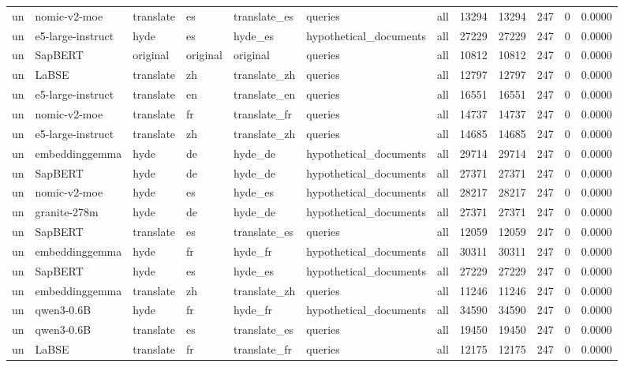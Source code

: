 \begin{tabular}{lllllllrrrrr}
un & nomic-v2-moe & translate & es & translate\_es & queries & all & 13294 & 13294 & 247 & 0 & 0.0000 \\
un & e5-large-instruct & hyde & es & hyde\_es & hypothetical\_documents & all & 27229 & 27229 & 247 & 0 & 0.0000 \\
un & SapBERT & original & original & original & queries & all & 10812 & 10812 & 247 & 0 & 0.0000 \\
un & LaBSE & translate & zh & translate\_zh & queries & all & 12797 & 12797 & 247 & 0 & 0.0000 \\
un & e5-large-instruct & translate & en & translate\_en & queries & all & 16551 & 16551 & 247 & 0 & 0.0000 \\
un & nomic-v2-moe & translate & fr & translate\_fr & queries & all & 14737 & 14737 & 247 & 0 & 0.0000 \\
un & e5-large-instruct & translate & zh & translate\_zh & queries & all & 14685 & 14685 & 247 & 0 & 0.0000 \\
un & embeddinggemma & hyde & de & hyde\_de & hypothetical\_documents & all & 29714 & 29714 & 247 & 0 & 0.0000 \\
un & SapBERT & hyde & de & hyde\_de & hypothetical\_documents & all & 27371 & 27371 & 247 & 0 & 0.0000 \\
un & nomic-v2-moe & hyde & es & hyde\_es & hypothetical\_documents & all & 28217 & 28217 & 247 & 0 & 0.0000 \\
un & granite-278m & hyde & de & hyde\_de & hypothetical\_documents & all & 27371 & 27371 & 247 & 0 & 0.0000 \\
un & SapBERT & translate & es & translate\_es & queries & all & 12059 & 12059 & 247 & 0 & 0.0000 \\
un & embeddinggemma & hyde & fr & hyde\_fr & hypothetical\_documents & all & 30311 & 30311 & 247 & 0 & 0.0000 \\
un & SapBERT & hyde & es & hyde\_es & hypothetical\_documents & all & 27229 & 27229 & 247 & 0 & 0.0000 \\
un & embeddinggemma & translate & zh & translate\_zh & queries & all & 11246 & 11246 & 247 & 0 & 0.0000 \\
un & qwen3-0.6B & hyde & fr & hyde\_fr & hypothetical\_documents & all & 34590 & 34590 & 247 & 0 & 0.0000 \\
un & qwen3-0.6B & translate & es & translate\_es & queries & all & 19450 & 19450 & 247 & 0 & 0.0000 \\
un & LaBSE & translate & fr & translate\_fr & queries & all & 12175 & 12175 & 247 & 0 & 0.0000 \\

\end{tabular}
